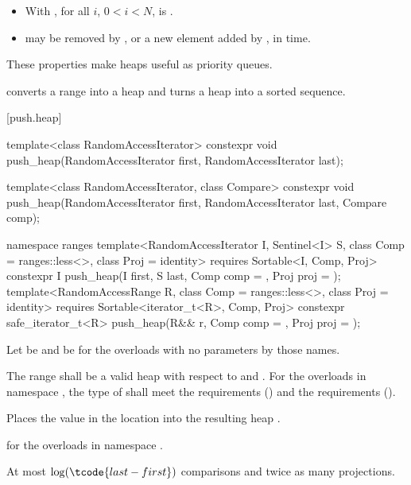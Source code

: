 \begin{itemize}
\item
  With , for all $i$, $0 < i < N$,
  is .
\item
   may be removed by , or
  a new element added by ,
  in  time.
\end{itemize}

\pnum
These properties make heaps useful as priority queues.

\pnum
{} converts a range into a heap and
 turns a heap into a sorted sequence.

[push.heap]{}

%
\begin{itemdecl}
template<class RandomAccessIterator>
  constexpr void push_heap(RandomAccessIterator first, RandomAccessIterator last);

template<class RandomAccessIterator, class Compare>
  constexpr void push_heap(RandomAccessIterator first, RandomAccessIterator last,
                           Compare comp);

namespace ranges {
  template<RandomAccessIterator I, Sentinel<I> S, class Comp = ranges::less<>,
           class Proj = identity>
    requires Sortable<I, Comp, Proj>
    constexpr I
      push_heap(I first, S last, Comp comp = {}, Proj proj = {});
  template<RandomAccessRange R, class Comp = ranges::less<>, class Proj = identity>
    requires Sortable<iterator_t<R>, Comp, Proj>
    constexpr safe_iterator_t<R>
      push_heap(R&& r, Comp comp = {}, Proj proj = {});
}
\end{itemdecl}

\begin{itemdescr}
\pnum
Let  be 
and  be 
for the overloads with no parameters by those names.

\pnum
\requires
The range 
shall be a valid heap with respect to  and .
For the overloads in namespace ,
the type of  shall meet
the  requirements () and
the  requirements ().

\pnum
\effects
Places the value in the location 
into the resulting heap .

\pnum
\returns
{} for the overloads in namespace .

\pnum
\complexity
At most $\log(\tcode{last - first})$ comparisons and twice as many projections.
\end{itemdescr}

